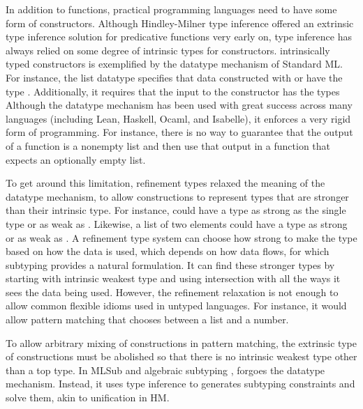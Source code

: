 \documentclass[table,dvipsnames,acmsmall]{acmart}
\theoremstyle{definition}
\begin{document}



In addition to functions, practical programming languages need to have some form of constructors.
Although Hindley-Milner type inference offered an extrinsic type inference solution for predicative functions
very early on, type inference has always relied on some degree of intrinsic types for constructors.
intrinsically typed constructors is exemplified by the datatype mechanism of Standard ML.
For instance, the list datatype  specifies that 
data constructed with  or  have the type . Additionally,
it requires that the input to the constructor   has the types 
Although the datatype mechanism has been used with great success across many languages (including Lean, Haskell, Ocaml, and Isabelle),
it enforces a very rigid form of programming. For instance, there is no way to guarantee
that the output of a function is a nonempty list and then use that output in a function that expects an optionally empty list.

To get around this limitation, refinement types \cite{} relaxed the meaning of the datatype mechanism, to 
allow constructions to represent types that are stronger than their intrinsic type.
For instance,  could have a type as strong as the single type  or as weak as .
Likewise, a list of two elements  could have a type as strong 
or as weak as . 
A refinement type system can choose how strong to make the type based on how the data is used, 
which depends on how data flows, for which subtyping provides a natural formulation. 
It can find these stronger types by starting with intrinsic weakest type and using intersection with 
all the ways it sees the data being used.
However, the refinement relaxation is not enough to allow common flexible idioms used in untyped languages. 
For instance, it would allow pattern matching that chooses between a list and a number.


To allow arbitrary mixing of constructions in pattern matching, the extrinsic type of constructions
must be abolished so that there is no intrinsic weakest type other than a top type. 
In MLSub and algebraic subtyping \cite{}, forgoes the datatype mechanism.
Instead, it uses type inference to generates subtyping constraints and solve them, akin to unification in HM.
\end{document}
